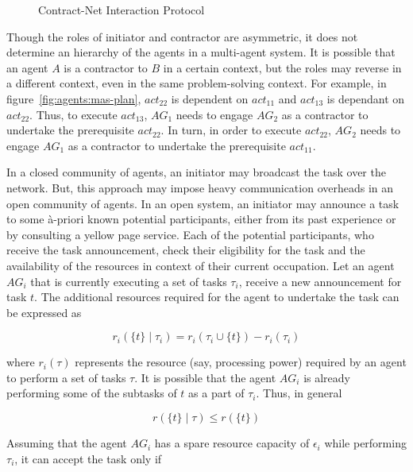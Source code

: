 \begin{figure} [!htbp]
	\centering
	\caption{Contract-Net Interaction Protocol}
	\label{fig:agents:contract-net}
\end{figure}

Though the roles of initiator and contractor are asymmetric, it does not determine an hierarchy of the agents in a multi-agent
system. It is possible that an agent $A$ is a contractor to $B$ in a certain context, but the roles may reverse in a different
context, even in the same problem-solving context. For example, in figure~\ref{fig:agents:mas-plan}, $act_{22}$ is dependent
on $act_{11}$ and $act_{13}$ is dependant on $act_{22}$. Thus, to execute $act_{13}$, $AG_1$ needs to engage $AG_2$ as a 
contractor to undertake the prerequisite $act_{22}$. In turn, in order to execute $act_{22}$, $AG_2$ needs to engage $AG_1$ as a
contractor to undertake the prerequisite $act_{11}$.

In a closed community of agents, an initiator may broadcast the task over the network. But, this approach may impose heavy 
communication overheads in an open community of agents. In an open system, an initiator may announce a task to some \`{a}-priori 
known potential participants, either from its past experience or by consulting a yellow page service. Each of the potential 
participants, who receive the task announcement, check their eligibility for the task and the availability of the resources 
in context of their current occupation.
Let an agent $AG_i$ that is currently executing a set of tasks $\tau_i$, receive a new announcement for task $t$. The additional resources 
required for the agent to undertake the task can be expressed as 

\begin{equation}
	r_i(\{ t \} \mid \tau_i) = r_i(\tau_i \cup \{ t \}) - r_i(\tau_i) 
\end{equation}

\noindent
where $r_i(\tau)$ represents the resource (say, processing power) required by an agent to perform a set of tasks $\tau$. It is possible 
that the agent $AG_i$ is already performing some of the subtasks of $t$ as a part of $\tau_i$. Thus, in general

\begin{equation}
	r(\{ t \} \mid \tau) \leq r(\{ t \}) 
\end{equation}

\noindent
Assuming that the agent $AG_i$ has a spare resource capacity of $\epsilon_i$ while performing $\tau_i$, it can accept the task only if

